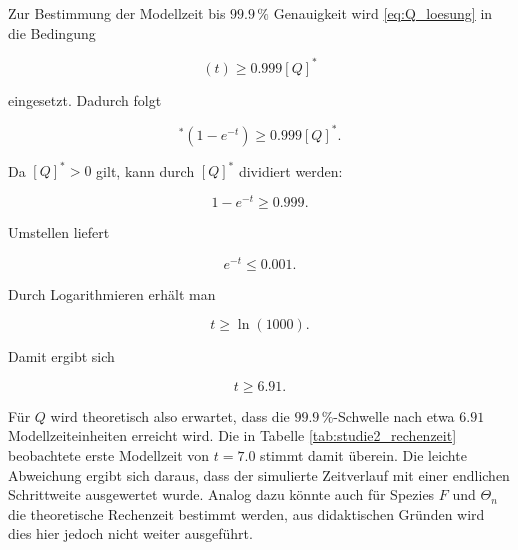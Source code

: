 Zur Bestimmung der Modellzeit bis \(99.9\,\%\) Genauigkeit wird
\eqref{eq:Q_loesung} in die Bedingung

\begin{equation}
    [Q](t)\geq0.999[Q]^*
\end{equation}

eingesetzt. Dadurch folgt

\begin{equation}
    [Q]^*
    \left(
        1-e^{-t}
    \right)
    \geq
    0.999[Q]^*.
\end{equation}

Da \([Q]^*>0\) gilt, kann durch \([Q]^*\) dividiert werden:

\begin{equation}
    1-e^{-t}
    \geq
    0.999.
\end{equation}

Umstellen liefert

\begin{equation}
    e^{-t}
    \leq
    0.001.
\end{equation}

Durch Logarithmieren erhält man

\begin{equation}
    t
    \geq
    \ln(1000).
\end{equation}

Damit ergibt sich

\begin{equation}
    t
    \geq
    6.91.
\end{equation}

Für \(Q\) wird theoretisch also erwartet, dass die
\(99.9\,\%\)-Schwelle nach etwa \(6.91\) Modellzeiteinheiten erreicht wird.
Die in Tabelle \ref{tab:studie2_rechenzeit} beobachtete erste Modellzeit
von \(t=7.0\) stimmt damit überein. Die leichte Abweichung ergibt sich
daraus, dass der simulierte Zeitverlauf mit einer endlichen Schrittweite
ausgewertet wurde. Analog dazu könnte auch für Spezies \(F\) und \(\Theta_n\) die theoretische Rechenzeit bestimmt werden, aus didaktischen Gründen wird dies hier jedoch nicht weiter ausgeführt.
